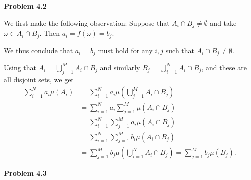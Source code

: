
\textbf{Problem 4.2}

We first make the following observation: Suppose that $A_i \cap B_j \ne \emptyset$ and take $\omega \in A_i \cap B_j$. Then $a_i = f(\omega) = b_j$. 

We thus conclude that $a_i = b_j$ must hold for any $i,j$ such that $A_i \cap B_j \ne \emptyset$.

Using that $A_i = \bigcup_{j = 1}^M A_i \cap B_j$ and similarly $B_j = \bigcup_{i = 1}^N A_i \cap B_j$, and these are all disjoint sets, we get
\begin{align*}
	\sum_{i = 1}^N a_i \mu(A_i) &= \sum_{i = 1}^N a_i \mu(\bigcup_{j = 1}^M A_i \cap B_j)\\
	&= \sum_{i = 1}^N a_i \sum_{j = 1}^M \mu(A_i \cap B_j) \\
	&= \sum_{i = 1}^N \sum_{j = 1}^M a_i \mu(A_i \cap B_j) \\
	&= \sum_{i = 1}^N \sum_{j = 1}^M b_i \mu(A_i \cap B_j) \\
	&= \sum_{j = 1}^M b_j \mu(\bigcup_{i = 1}^N A_i \cap B_j) = \sum_{j = 1}^M b_j \mu(B_j).
\end{align*}


\bigskip

\textbf{Problem 4.3}

